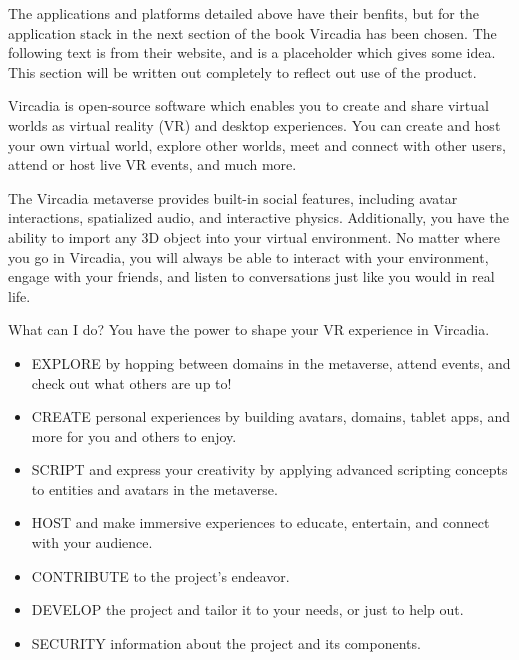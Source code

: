 The applications and platforms detailed above have their benfits, but for the application stack in the next section of the book Vircadia has been chosen. The following text is from their website, and is a placeholder which gives some idea. This section will be written out completely to reflect out use of the product.\par
Vircadia is open-source software which enables you to create and share virtual worlds as virtual reality (VR) and desktop experiences. You can create and host your own virtual world, explore other worlds, meet and connect with other users, attend or host live VR events, and much more.\par
The Vircadia metaverse provides built-in social features, including avatar interactions, spatialized audio, and interactive physics. Additionally, you have the ability to import any 3D object into your virtual environment. No matter where you go in Vircadia, you will always be able to interact with your environment, engage with your friends, and listen to conversations just like you would in real life.\par
What can I do? You have the power to shape your VR experience in Vircadia.
\begin{itemize}
\item EXPLORE by hopping between domains in the metaverse, attend events, and check out what others are up to!
\item CREATE personal experiences by building avatars, domains, tablet apps, and more for you and others to enjoy.
\item SCRIPT and express your creativity by applying advanced scripting concepts to entities and avatars in the metaverse.
\item HOST and make immersive experiences to educate, entertain, and connect with your audience.
\item CONTRIBUTE to the project's endeavor.
\item DEVELOP the project and tailor it to your needs, or just to help out.
\item SECURITY information about the project and its components.
\end{itemize}
   